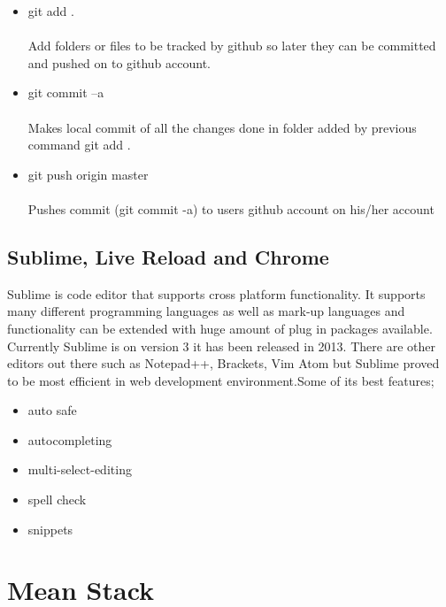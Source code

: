 \begin{itemize}
\begin{itemize}
\item git add . \\ 
\\Add folders or files to be tracked by github so later they can be committed and pushed on to github account.

\item git commit –a \\
\\Makes local commit of all the changes done in folder added by previous command git add .

\item git push origin master \\ 
\\ Pushes commit (git commit -a) to users github account on his/her account

\end{itemize}


\subsection{Sublime, Live Reload and Chrome}
\bigbreak
Sublime is code editor that supports cross platform functionality. It supports many different programming languages as well as mark-up languages and functionality can be extended with huge amount of plug in packages available. Currently Sublime is on version 3 it has been released in 2013.
There are other editors out there such as Notepad++, Brackets, Vim Atom but Sublime proved to be most efficient in web development environment.Some of its best features;

\begin{itemize}
	
	\item auto safe 
	\item autocompleting 
	\item multi-select-editing 
	\item spell check 
	\item snippets  

\end{itemize}





\section{Mean Stack}

\end{itemize}
